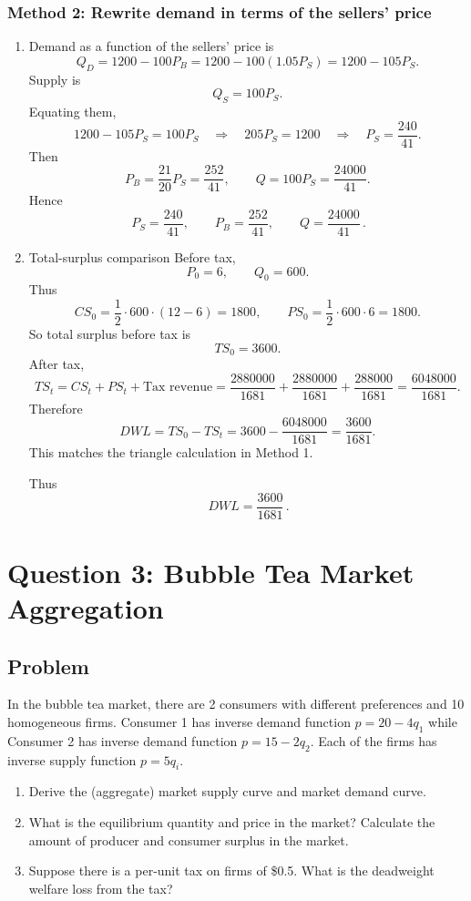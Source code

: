 \documentclass[12pt]{article}
\begin{document}
\subsubsection{Method 2: Rewrite demand in terms of the sellers' price}
\begin{enumerate}[label=(\alph*)]
    \item Demand as a function of the sellers' price is
\[
Q_D=1200-100P_B
=1200-100(1.05P_S)
=1200-105P_S.
\]
Supply is
\[
Q_S=100P_S.
\]
Equating them,
\[
1200-105P_S=100P_S
\quad\Longrightarrow\quad
205P_S=1200
\quad\Longrightarrow\quad
P_S=\frac{240}{41}.
\]
Then
\[
P_B=\frac{21}{20}P_S=\frac{252}{41},
\qquad
Q=100P_S=\frac{24000}{41}.
\]
Hence
\[
\boxed{\,P_S=\frac{240}{41},\qquad P_B=\frac{252}{41},\qquad Q=\frac{24000}{41}\,.}
\]

\newpage


    \item Total-surplus comparison
Before tax,
\[
P_0=6,\qquad Q_0=600.
\]
Thus
\[
CS_0=\frac{1}{2}\cdot 600\cdot (12-6)=1800,
\qquad
PS_0=\frac{1}{2}\cdot 600\cdot 6=1800.
\]
So total surplus before tax is
\[
TS_0=3600.
\]
After tax,
\[
TS_t=CS_t+PS_t+\text{Tax revenue}
=\frac{2880000}{1681}+\frac{2880000}{1681}+\frac{288000}{1681}
=\frac{6048000}{1681}.
\]
Therefore
\[
DWL=TS_0-TS_t
=3600-\frac{6048000}{1681}
=\frac{3600}{1681}.
\]
This matches the triangle calculation in Method 1.

Thus
\[
\boxed{\,DWL=\frac{3600}{1681}\,.}
\]

\end{enumerate}

\newpage

\newpage
\section{Question 3: Bubble Tea Market Aggregation}

\subsection{Problem}
\noindent
In the bubble tea market, there are 2 consumers with different preferences and 10 homogeneous firms. Consumer 1 has inverse demand function \(p = 20 - 4q_1\) while Consumer 2 has inverse demand function \(p = 15 - 2q_2\). Each of the firms has inverse supply function \(p = 5q_i\).
\begin{enumerate}[label=(\alph*), leftmargin=*]
  \item Derive the (aggregate) market supply curve and market demand curve.
  \item What is the equilibrium quantity and price in the market? Calculate the amount of producer and consumer surplus in the market.
  \item Suppose there is a per-unit tax on firms of \$0.5. What is the deadweight welfare loss from the tax?
\end{enumerate}
\end{document}
